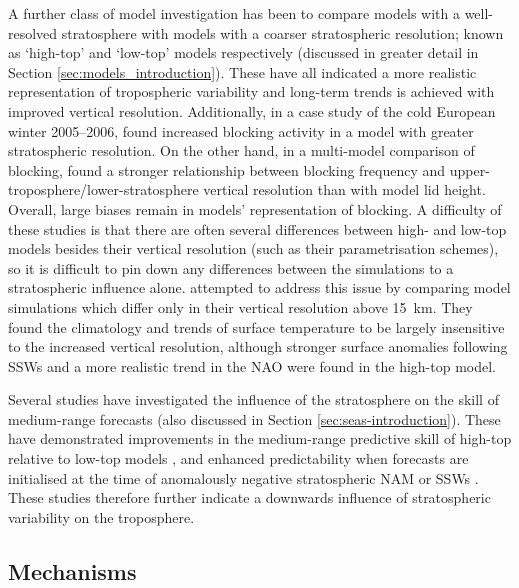 A further class of model investigation has been to compare models with a
well-resolved stratosphere with models with a coarser stratospheric resolution;
known as `high-top' and `low-top' models respectively \citep{Huebener2007,
  Sigmond2008, Cagnazzo2009, Sassi2010, Scaife2011, Charlton-Perez2013}
(discussed in greater detail in Section \ref{sec:models_introduction}). These
have all indicated a more realistic representation of tropospheric variability
and long-term trends is achieved with improved vertical
resolution. Additionally, in a case study of the cold European winter
2005--2006, \citet{Scaife2008} found increased blocking activity in a model with
greater stratospheric resolution. On the other hand, in a multi-model comparison
of blocking, \citet{Anstey2013} found a stronger relationship between blocking
frequency and upper-troposphere/lower-stratosphere vertical resolution than with
model lid height. Overall, large biases remain in models' representation of
blocking. A difficulty of these studies is that there are often several
differences between high- and low-top models besides their vertical resolution
(such as their parametrisation schemes), so it is difficult to pin down any
differences between the simulations to a stratospheric influence
alone. \citet{Hardiman2012} attempted to address this issue by comparing model
simulations which differ only in their vertical resolution above 15~km. They
found the climatology and trends of surface temperature to be largely
insensitive to the increased vertical resolution, although stronger surface
anomalies following SSWs and a more realistic trend in the NAO were found in the
high-top model.

Several studies have investigated the influence of the stratosphere on the skill
of medium-range forecasts (also discussed in Section
\ref{sec:seas-introduction}). These have demonstrated improvements in the
medium-range predictive skill of high-top relative to low-top models
\citep{Marshall2010,Roff2011}, and enhanced predictability when forecasts are
initialised at the time of anomalously negative stratospheric NAM or SSWs
\citep{Kuroda2008,Mukougawa2009,Sigmond2013}. These studies therefore further
indicate a downwards influence of stratospheric variability on the troposphere. 




\subsection{Mechanisms}
\label{sec:mechanisms}


